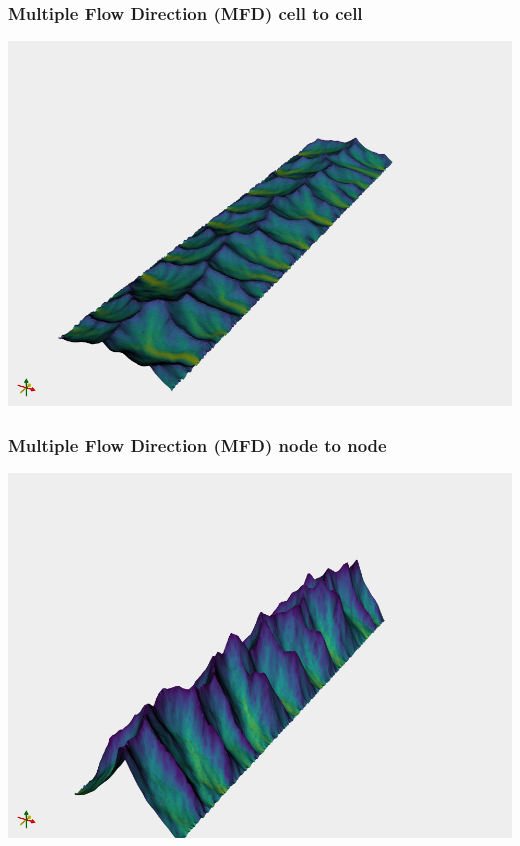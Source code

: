 \documentclass[aspectratio=169]{beamer}
\begin{document}
\begin{frame}
    \frametitle{Multiple Flow Direction (MFD) cell to cell}
    \centering
    \includegraphics[height=0.9\paperheight]{./figures/flem-mfd-c2c.png}
\end{frame}

\begin{frame}
    \frametitle{Multiple Flow Direction (MFD) node to node}
    \centering
    \includegraphics[height=0.9\paperheight]{./figures/flem-mfd-n2n.png}
\end{frame}
\end{document}
